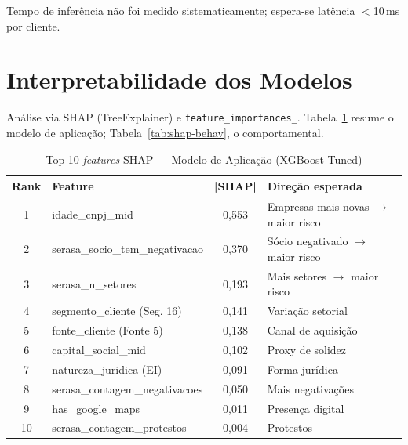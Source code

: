 \documentclass[conference]{IEEEtran}
\newcommand{\code}[1]{\texttt{#1}}
\begin{document}
Tempo de inferência não foi medido sistematicamente; espera-se latência $<$10\,ms por cliente.

\section{Interpretabilidade dos Modelos}

Análise via SHAP (TreeExplainer) e \code{feature\_importances\_}. Tabela~\ref{tab:shap-app} resume o modelo de aplicação; Tabela~\ref{tab:shap-behav}, o comportamental.

\begin{table}[!t]
\caption{Top 10 \textit{features} SHAP --- Modelo de Aplicação (XGBoost Tuned)}
\label{tab:shap-app}
\centering
\small
\begin{tabular}{clcl}
\toprule
\textbf{Rank} & \textbf{Feature} & \textbf{|SHAP|} & \textbf{Direção esperada} \\
\midrule
1 & idade\_cnpj\_mid & 0,553 & Empresas mais novas $\rightarrow$ maior risco \\
2 & serasa\_socio\_tem\_negativacao & 0,370 & Sócio negativado $\rightarrow$ maior risco \\
3 & serasa\_n\_setores & 0,193 & Mais setores $\rightarrow$ maior risco \\
4 & segmento\_cliente (Seg. 16) & 0,141 & Variação setorial \\
5 & fonte\_cliente (Fonte 5) & 0,138 & Canal de aquisição \\
6 & capital\_social\_mid & 0,102 & Proxy de solidez \\
7 & natureza\_juridica (EI) & 0,091 & Forma jurídica \\
8 & serasa\_contagem\_negativacoes & 0,050 & Mais negativações \\
9 & has\_google\_maps & 0,011 & Presença digital \\
10 & serasa\_contagem\_protestos & 0,004 & Protestos \\
\bottomrule
\end{tabular}
\end{table}
\end{document}
